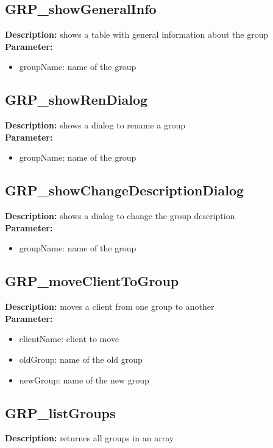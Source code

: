\subsection{GRP\_showGeneralInfo}
\textbf{Description:} shows a table with general information about the group\\
\textbf{Parameter:}
\begin{itemize}
\item groupName: name of the group
\end{itemize}

\subsection{GRP\_showRenDialog}
\textbf{Description:} shows a dialog to rename a group\\
\textbf{Parameter:}
\begin{itemize}
\item groupName: name of the group
\end{itemize}

\subsection{GRP\_showChangeDescriptionDialog}
\textbf{Description:} shows a dialog to change the group description\\
\textbf{Parameter:}
\begin{itemize}
\item groupName: name of the group
\end{itemize}

\subsection{GRP\_moveClientToGroup}
\textbf{Description:} moves a client from one group to another\\
\textbf{Parameter:}
\begin{itemize}
\item clientName: client to move
\item oldGroup: name of the old group
\item newGroup: name of the new group
\end{itemize}

\subsection{GRP\_listGroups}
\textbf{Description:} returnes all groups in an array\\

